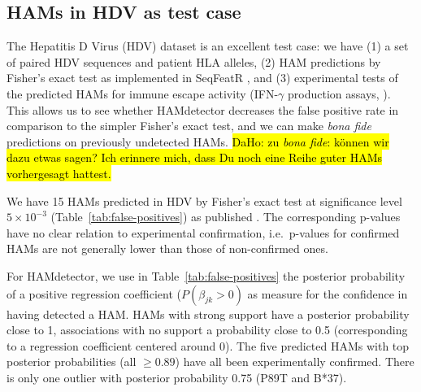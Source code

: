 \documentclass{bioinfo}
\begin{document}
\subsection{HAMs in HDV as test case}
The Hepatitis D Virus (HDV) dataset \citep{Karimzadeh2019} is an excellent test case: we have (1) a set of paired HDV sequences and patient HLA alleles, (2) HAM predictions by Fisher's exact test as implemented in SeqFeatR \citep{Budeus2016}, and (3) experimental tests of the predicted HAMs for immune escape activity (IFN-\(\gamma\) production assays, \citet{Karimzadeh2019}). This allows us to see whether HAMdetector decreases the false positive rate in comparison to the simpler Fisher's exact test, and we can make \emph{bona fide} predictions on previously undetected HAMs. \hl{DaHo: zu \emph{bona fide}: können wir dazu etwas sagen? Ich erinnere mich, dass Du noch eine Reihe guter HAMs vorhergesagt hattest.}

We have 15 HAMs predicted in HDV by Fisher's exact test at significance level $5\times 10^{-3}$ (Table~\ref{tab:false-positives}) as published \citep{Karimzadeh2019}. The corresponding p-values  have no clear relation to experimental confirmation, i.e.\ p-values for confirmed HAMs are not generally lower than those of non-confirmed ones.

For HAMdetector, we use in Table~\ref{tab:false-positives} the posterior probability of a positive regression coefficient ($P(\beta_{jk}>0)$ as measure for the confidence in having detected a HAM. HAMs with strong support have a posterior probability close to 1, associations with no support a probability close to 0.5 (corresponding to a regression coefficient centered around 0). The five predicted HAMs with top posterior probabilities (all $\ge 0.89$) have all been experimentally confirmed. There is only one outlier with posterior probability 0.75 (P89T and B*37).
\end{document}
